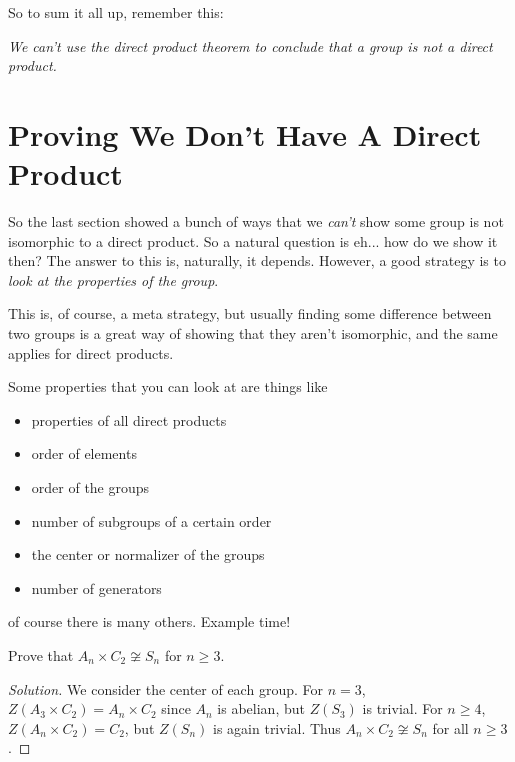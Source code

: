 \documentclass[11pt]{article}
\begin{document}
So to sum it all up, remember this:
\begin{center}
	\emph{We can't use the direct product theorem to conclude that a group is not a direct product.}
\end{center}

\section{Proving We Don't Have A Direct Product}

So the last section showed a bunch of ways that we \emph{can't} show some group is not isomorphic to a direct product. So a natural question is eh... how do we show it then? The answer to this is, naturally, it depends. However, a good strategy is to \emph{look at the properties of the group}.

This is, of course, a meta strategy, but usually finding some difference between two groups is a great way of showing that they aren't isomorphic, and the same applies for direct products.

Some properties that you can look at are things like
\begin{itemize}
	\item properties of all direct products
	\item order of elements
	\item order of the groups
	\item number of subgroups of a certain order
	\item the center or normalizer of the groups
	\item number of generators
\end{itemize}
of course there is many others. Example time!

\begin{example}
	Prove that $A_n \times C_2 \not \cong S_n$ for $n \geq 3$.
\end{example}
\begin{proof}[Solution]
	We consider the center of each group. For $n = 3$, $Z(A_3 \times C_2) = A_n \times C_2$ since $A_n$ is abelian, but $Z(S_3)$ is trivial. For $n \geq 4$, $Z(A_n \times C_2) = C_2$, but $Z(S_n)$ is again trivial.
	Thus $A_n \times C_2 \not \cong S_n$ for all $n \geq 3$.
\end{proof}
\end{document}

